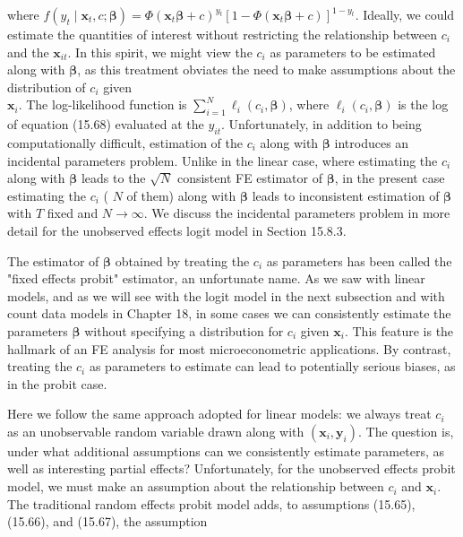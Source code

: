 \documentclass[10pt]{article}
\begin{document}
where $f\left(y_{t} \mid \mathbf{x}_{t}, c ; \boldsymbol{\beta}\right)=\Phi\left(\mathbf{x}_{t} \boldsymbol{\beta}+c\right)^{y_{t}}\left[1-\Phi\left(\mathbf{x}_{t} \boldsymbol{\beta}+c\right)\right]^{1-y_{t}}$. Ideally, we could estimate the quantities of interest without restricting the relationship between $c_{i}$ and the $\mathbf{x}_{i t}$. In this spirit, we might view the $c_{i}$ as parameters to be estimated along with $\boldsymbol{\beta}$, as this treatment obviates the need to make assumptions about the distribution of $c_{i}$ given\\
$\mathbf{x}_{i}$. The log-likelihood function is $\sum_{i=1}^{N} \ell_{i}\left(c_{i}, \boldsymbol{\beta}\right)$, where $\ell_{i}\left(c_{i}, \boldsymbol{\beta}\right)$ is the log of equation (15.68) evaluated at the $y_{i t}$. Unfortunately, in addition to being computationally difficult, estimation of the $c_{i}$ along with $\boldsymbol{\beta}$ introduces an incidental parameters problem. Unlike in the linear case, where estimating the $c_{i}$ along with $\boldsymbol{\beta}$ leads to the $\sqrt{N}$ consistent FE estimator of $\boldsymbol{\beta}$, in the present case estimating the $c_{i}$ ( $N$ of them) along with $\boldsymbol{\beta}$ leads to inconsistent estimation of $\boldsymbol{\beta}$ with $T$ fixed and $N \rightarrow \infty$. We discuss the incidental parameters problem in more detail for the unobserved effects logit model in Section 15.8.3.

The estimator of $\boldsymbol{\beta}$ obtained by treating the $c_{i}$ as parameters has been called the "fixed effects probit" estimator, an unfortunate name. As we saw with linear models, and as we will see with the logit model in the next subsection and with count data models in Chapter 18, in some cases we can consistently estimate the parameters $\boldsymbol{\beta}$ without specifying a distribution for $c_{i}$ given $\mathbf{x}_{i}$. This feature is the hallmark of an FE analysis for most microeconometric applications. By contrast, treating the $c_{i}$ as parameters to estimate can lead to potentially serious biases, as in the probit case.

Here we follow the same approach adopted for linear models: we always treat $c_{i}$ as an unobservable random variable drawn along with $\left(\mathbf{x}_{i}, \mathbf{y}_{i}\right)$. The question is, under what additional assumptions can we consistently estimate parameters, as well as interesting partial effects? Unfortunately, for the unobserved effects probit model, we must make an assumption about the relationship between $c_{i}$ and $\mathbf{x}_{i}$. The traditional random effects probit model adds, to assumptions (15.65), (15.66), and (15.67), the assumption
\end{document}
